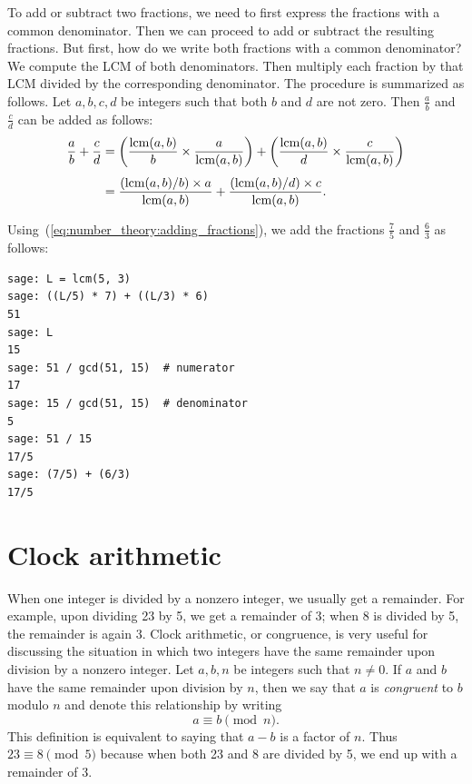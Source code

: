 To add or subtract two fractions, we need to first express the
fractions with a common denominator. Then we can proceed to add or
subtract the resulting fractions. But first, how do we write both
fractions with a common denominator? We compute the LCM of both
denominators. Then multiply each fraction by that LCM divided by the
corresponding denominator. The procedure is summarized as follows. Let
$a,b,c,d$ be integers such that both $b$ and $d$ are not zero. Then
$\frac{a}{b}$ and $\frac{c}{d}$ can be added as follows:
%
\begin{equation}
\label{eq:number_theory:adding_fractions}
\begin{aligned}
\frac{a}{b} + \frac{c}{d}
&=
\left( \frac{\operatorname*{\text{lcm}}(a,b)}{b} \times \frac{a}{\operatorname*{\text{lcm}}(a,b)} \right)
+
\left( \frac{\operatorname*{\text{lcm}}(a,b)}{d} \times \frac{c}{\operatorname*{\text{lcm}}(a,b)} \right) \\[4pt]
&=
\frac{(\operatorname*{\text{lcm}}(a,b) / b) \times a} {\operatorname*{\text{lcm}}(a,b)}
+
\frac{(\operatorname*{\text{lcm}}(a,b) / d) \times c} {\operatorname*{\text{lcm}}(a,b)}.
\end{aligned}
\end{equation}

Using~(\ref{eq:number_theory:adding_fractions}), we add the fractions
$\frac{7}{5}$ and $\frac{6}{3}$ as follows:

\begin{lstlisting}
sage: L = lcm(5, 3)
sage: ((L/5) * 7) + ((L/3) * 6)
51
sage: L
15
sage: 51 / gcd(51, 15)  # numerator
17
sage: 15 / gcd(51, 15)  # denominator
5
sage: 51 / 15
17/5
sage: (7/5) + (6/3)
17/5
\end{lstlisting}



\section{Clock arithmetic}

When one integer is divided by a nonzero integer, we usually get a
remainder. For example, upon dividing 23 by 5, we get a remainder of
3; when 8 is divided by 5, the remainder is again 3. Clock arithmetic,
or congruence, is very useful for discussing the situation in which
two integers have the same remainder upon division by a nonzero
integer. Let $a,b,n$ be integers such that $n \neq 0$. If $a$ and $b$
have the same remainder upon division by $n$, then we say that $a$ is
\emph{congruent} to $b$ modulo $n$ and denote this relationship by
writing
\[
a \equiv b \pmod{n}.
\]
This definition is equivalent to saying that $a - b$ is a factor of
$n$. Thus $23 \equiv 8 \pmod{5}$ because when both 23 and 8 are
divided by 5, we end up with a remainder of 3.

